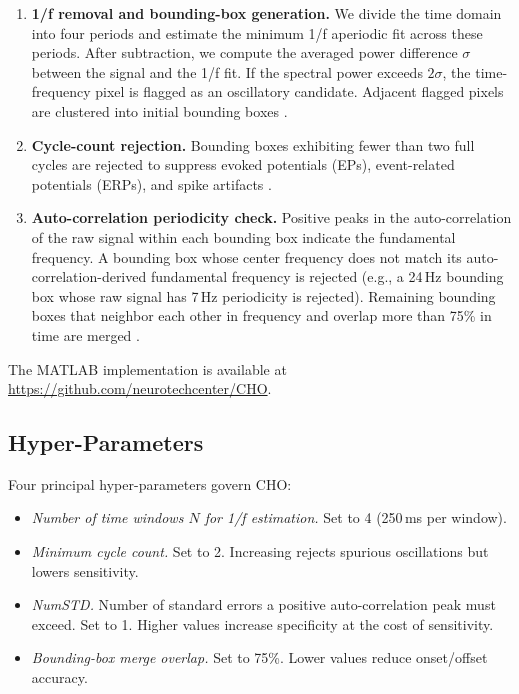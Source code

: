 \documentclass[11pt]{article}
\begin{document}
\begin{enumerate}
\item \textbf{1/f removal and bounding-box generation.} We divide the time domain into four periods and estimate the minimum 1/f aperiodic fit across these periods. After subtraction, we compute the averaged power difference $\sigma$ between the signal and the 1/f fit. If the spectral power exceeds $2\sigma$, the time-frequency pixel is flagged as an oscillatory candidate. Adjacent flagged pixels are clustered into initial bounding boxes \citep{neymotin2022}.
\item \textbf{Cycle-count rejection.} Bounding boxes exhibiting fewer than two full cycles are rejected to suppress evoked potentials (EPs), event-related potentials (ERPs), and spike artifacts \citep{decheveigne2019,donoghue2020,donoghue2022}.
\item \textbf{Auto-correlation periodicity check.} Positive peaks in the auto-correlation of the raw signal within each bounding box indicate the fundamental frequency. A bounding box whose center frequency does not match its auto-correlation-derived fundamental frequency is rejected (e.g., a 24\,Hz bounding box whose raw signal has 7\,Hz periodicity is rejected). Remaining bounding boxes that neighbor each other in frequency and overlap more than 75\% in time are merged \citep{neymotin2022}.
\end{enumerate}

The MATLAB implementation is available at \url{https://github.com/neurotechcenter/CHO}.

\subsection{Hyper-Parameters}
Four principal hyper-parameters govern CHO:
\begin{itemize}
\item \textit{Number of time windows $N$ for 1/f estimation.} Set to 4 (250\,ms per window).
\item \textit{Minimum cycle count.} Set to 2. Increasing rejects spurious oscillations but lowers sensitivity.
\item \textit{NumSTD.} Number of standard errors a positive auto-correlation peak must exceed. Set to 1. Higher values increase specificity at the cost of sensitivity.
\item \textit{Bounding-box merge overlap.} Set to 75\%. Lower values reduce onset/offset accuracy.
\end{itemize}
\end{document}
